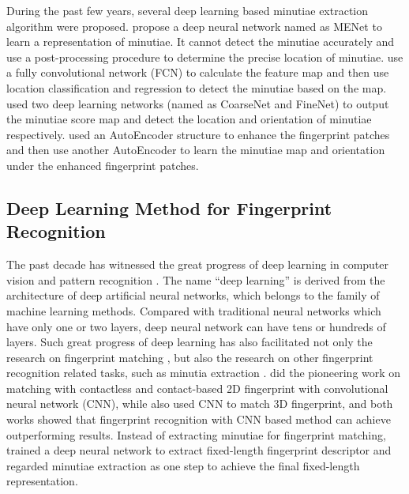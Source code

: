 During the past few years, several deep learning based minutiae extraction algorithm were proposed.
\cite{darlowFingerprintMinutiaeExtraction2017a} propose a deep neural network named as MENet to learn a representation of minutiae.
It cannot detect the minutiae accurately and use a post-processing procedure to determine the precise location of minutiae.
\cite{tangLatentFingerprintMinutia2017a} use a fully convolutional network (FCN) \cite{FCN} to calculate the feature map and then use location classification and regression to detect the minutiae based on the map.
\cite{NguyenICB2018} used two deep learning networks (named as CoarseNet and FineNet) to output the minutiae score map and detect the location and orientation of minutiae respectively.
\cite{End2End} used an AutoEncoder structure to enhance the fingerprint patches and then use another AutoEncoder to learn the minutiae map and orientation under the enhanced fingerprint patches.


\subsection{Deep Learning Method for Fingerprint Recognition}
The past decade has witnessed the great progress of deep learning in computer vision and pattern recognition \cite{HeCVPR2016ResNet} \cite{Simonyan2014VGG} \cite{SzegedyCVPR2015InceptionV1}. The name “deep learning” is derived from the architecture of deep artificial neural networks, which belongs to the family of machine learning methods. Compared with traditional neural networks which have only one or two layers, deep neural network can have tens or hundreds of layers. Such great progress of deep learning has also facilitated not only the research on fingerprint matching \cite{CaoTPAMI2018}, but also the research on other fingerprint recognition related tasks, such as minutia extraction \cite{TangIJCB2017} \cite{NguyenICB2018}. \cite{LinTIFS2018} did the pioneering work on matching with contactless and contact-based 2D fingerprint with convolutional neural network (CNN), while \cite{LinPR2018} also used CNN to match 3D fingerprint, and both works showed that fingerprint recognition with CNN based method can achieve outperforming results. Instead of extracting minutiae for fingerprint matching, \cite{EngelsmaTPAMI2019} trained a deep neural network to extract fixed-length fingerprint descriptor and regarded minutiae extraction as one step to achieve the final fixed-length representation.

